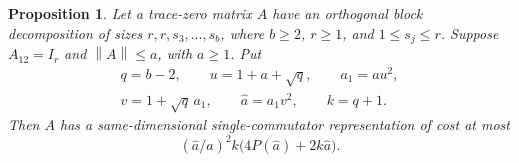 \documentclass[11pt]{article}
\newtheorem{proposition}[theorem]{Proposition}
\theoremstyle{remark}
\newcommand{\norm}[1]{\left\lVert#1\right\rVert}
\numberwithin{equation}{section}
\begin{document}
\begin{proposition}\label{prop:absorb}
Let a trace-zero matrix $A$ have an orthogonal block decomposition of sizes
$r,r,s_3,\ldots,s_b$, where $b\ge2$, $r\ge1$, and $1\le s_j\le r$.
Suppose $A_{12}=I_r$ and
$\norm A\le a$, with $a\ge1$. Put
\begin{equation}\label{eq:iterate}
\begin{gathered}
 q=b-2,\qquad u=1+a+\sqrt q,\qquad a_1=au^2,\\
 v=1+\sqrt q\,a_1,\qquad \widehat a=a_1v^2,\qquad k=q+1.
\end{gathered}
\end{equation}
Then $A$ has a same-dimensional single-commutator representation of cost at most
\begin{equation}\label{eq:absorb}
 (\widehat a/a)^2 k\bigl(4P(\widehat a)+2k\widehat a\bigr).
\end{equation}
\end{proposition}
\end{document}
